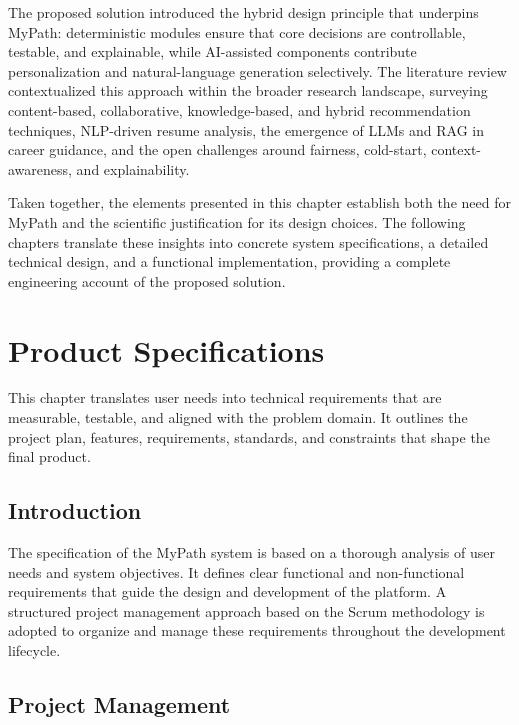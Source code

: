 \documentclass[12pt,a4paper]{article}
\begin{document}
The proposed solution introduced the hybrid design principle that underpins MyPath: deterministic modules ensure that core decisions are controllable, testable, and explainable, while AI-assisted components contribute personalization and natural-language generation selectively. The literature review contextualized this approach within the broader research landscape, surveying content-based, collaborative, knowledge-based, and hybrid recommendation techniques, NLP-driven resume analysis, the emergence of LLMs and RAG in career guidance, and the open challenges around fairness, cold-start, context-awareness, and explainability.

Taken together, the elements presented in this chapter establish both the need for MyPath and the scientific justification for its design choices. The following chapters translate these insights into concrete system specifications, a detailed technical design, and a functional implementation, providing a complete engineering account of the proposed solution.

\clearpage

\section{Product Specifications}

This chapter translates user needs into technical requirements that are measurable, testable, and aligned with the problem domain. It outlines the project plan, features, requirements, standards, and constraints that shape the final product.

\subsection{Introduction}

The specification of the MyPath system is based on a thorough analysis of user needs and system objectives. It defines clear functional and non-functional requirements that guide the design and development of the platform. A structured project management approach based on the Scrum methodology is adopted to organize and manage these requirements throughout the development lifecycle.

\subsection{Project Management}
\end{document}
